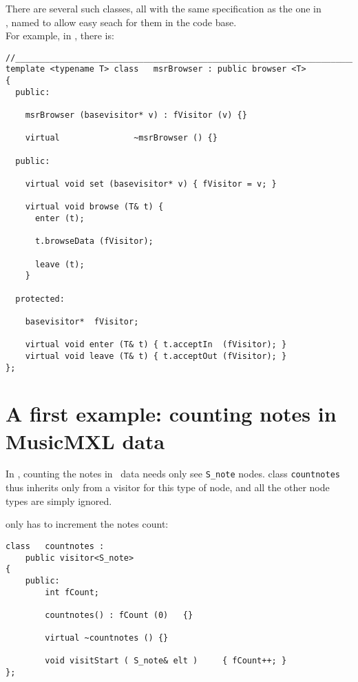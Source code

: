 There are several such classes, all with the same specification as the one in\\
, named to allow easy seach for them in the code base.\\
For example, in , there is:
\begin{lstlisting}[language=CPlusPlus]
//______________________________________________________________________________
template <typename T> class   msrBrowser : public browser <T>
{
  public:

    msrBrowser (basevisitor* v) : fVisitor (v) {}

    virtual               ~msrBrowser () {}

  public:

    virtual void set (basevisitor* v) { fVisitor = v; }

    virtual void browse (T& t) {
      enter (t);

      t.browseData (fVisitor);

      leave (t);
    }

  protected:

    basevisitor*  fVisitor;

    virtual void enter (T& t) { t.acceptIn  (fVisitor); }
    virtual void leave (T& t) { t.acceptOut (fVisitor); }
};
\end{lstlisting}


\section{A first example: counting notes in MusicMXL data}

In , counting the notes in \mxml\ data needs only see {\tt S_note} nodes. class   {\tt countnotes} thus inherits only from a visitor for this type of node, and all the other node types are simply ignored.

 only has to increment the notes count:
\begin{lstlisting}[language=CPlusPlus,caption={{\tt countnotes.cpp}}]
class   countnotes :
	public visitor<S_note>
{
	public:
		int	fCount;

		countnotes() : fCount (0)	{}

		virtual ~countnotes () {}

		void visitStart ( S_note& elt )		{ fCount++; }
};
\end{lstlisting}

